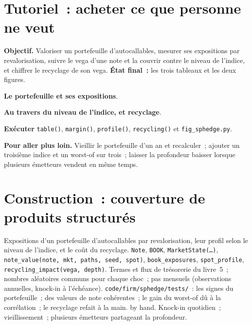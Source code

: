 \section{Tutoriel~: acheter ce que personne ne veut}\label{tut:s2:hedging-a-structured-products-book:tut}

\begin{tutorial}
\textbf{Objectif.} Valoriser un portefeuille d'autocallables, mesurer ses expositions par revalorisation, suivre le vega d'une note et la couvrir contre le niveau de l'indice, et chiffrer le
recyclage de son vega. \textbf{État final~:} les trois tableaux et les deux figures.
\begin{tutsteps}
\item \textbf{Le portefeuille et ses expositions}.
\label{lst:s2:hedging-a-structured-products-book:book}
\item \textbf{Au travers du niveau de l'indice, et recyclage}.
\label{lst:s2:hedging-a-structured-products-book:profile}
\item \textbf{Exécuter} \texttt{table()}, \texttt{margin()}, \texttt{profile()}, \texttt{recycling()} et \texttt{fig\_sphedge.py}.
\end{tutsteps}
\textbf{Pour aller plus loin.} Vieillir le portefeuille d'un an et recalculer~; ajouter un troisième indice et un worst-of sur trois~; laisser la profondeur baisser lorsque plusieurs émetteurs vendent
en même temps.
\end{tutorial}

\section{Construction~: couverture de produits structurés}\label{bld:s2:hedging-a-structured-products-book:sphedge}

\begin{build}
 Expositions d'un portefeuille d'autocallables par revalorisation, leur profil selon le niveau de l'indice, et le coût du recyclage.
 \texttt{Note}, \texttt{BOOK}, \texttt{MarketState(\dots)}, \texttt{note\_value(note, mkt, paths, seed, spot)},
\texttt{book\_exposures}, \texttt{spot\_profile}, \texttt{recycling\_impact(vega, depth)}.
 Termes et flux de trésorerie du livre~5~; nombres aléatoires communs pour chaque choc~; pas mensuels (observations annuelles, knock-in à l'échéance).
 \texttt{code/firm/sphedge/tests/}~: les signes du portefeuille~; des valeurs de note cohérentes~; le gain du worst-of dû à la corrélation~; le recyclage refait à la main.
by hand.
 Knock-in quotidien~; vieillissement~; plusieurs émetteurs partageant la profondeur.
\end{build}

